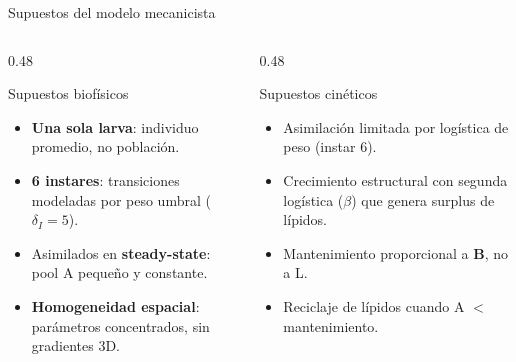 \documentclass[aspectratio=169, 11pt]{beamer}
\begin{document}
\begin{frame}{Supuestos del modelo mecanicista}
    \begin{columns}[T]
        \begin{column}{0.48\textwidth}
            \begin{block}{Supuestos biof\'{i}sicos}
                \begin{itemize}
                    \item \textbf{Una sola larva}: individuo promedio, no poblaci\'{o}n.
                    \item \textbf{6 instares}: transiciones modeladas por peso umbral ($\delta_I = 5$).
                    \item Asimilados en \textbf{steady-state}: pool A peque\~{n}o y constante.
                    \item \textbf{Homogeneidad espacial}: par\'{a}metros concentrados, sin gradientes 3D.
                \end{itemize}
            \end{block}
        \end{column}
        \begin{column}{0.48\textwidth}
            \begin{block}{Supuestos cin\'{e}ticos}
                \begin{itemize}
                    \item Asimilaci\'{o}n limitada por log\'{i}stica de peso (instar 6).
                    \item Crecimiento estructural con segunda log\'{i}stica ($\beta$) que genera surplus de l\'{i}pidos.
                    \item Mantenimiento proporcional a \textbf{B}, no a L.
                    \item Reciclaje de l\'{i}pidos cuando A $<$ mantenimiento.
                \end{itemize}
            \end{block}
        \end{column}
    \end{columns}
\end{frame}
\end{document}
